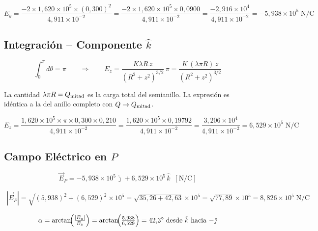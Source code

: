 \documentclass[12pt,letterpaper]{article}
\begin{document}
\begin{equation*}
    E_y = \frac{-2\times1{,}620\times10^5\times(0{,}300)^2}{4{,}911\times10^{-2}}
    = \frac{-2\times1{,}620\times10^5\times0{,}0900}{4{,}911\times10^{-2}}
    = \frac{-2{,}916\times10^4}{4{,}911\times10^{-2}}
    = -5{,}938\times10^5\;\text{N/C}
\end{equation*}

\subsection*{Integraci\'on -- Componente $\hat{k}$}

\begin{equation*}
    \int_0^{\pi}d\theta = \pi
    \qquad\Rightarrow\qquad
    E_z = \frac{K\lambda R\,z}{(R^2+z^2)^{3/2}}\,\pi
    = \frac{K\,(\lambda\pi R)\,z}{(R^2+z^2)^{3/2}}
\end{equation*}

La cantidad $\lambda\pi R = Q_{\rm mitad}$ es la carga total del semianillo. La expresi\'on es
id\'entica a la del anillo completo con $Q\to Q_{\rm mitad}$.

\begin{equation*}
    E_z = \frac{1{,}620\times10^5\times\pi\times0{,}300\times0{,}210}{4{,}911\times10^{-2}}
    = \frac{1{,}620\times10^5\times0{,}19792}{4{,}911\times10^{-2}}
    = \frac{3{,}206\times10^4}{4{,}911\times10^{-2}}
    = 6{,}529\times10^5\;\text{N/C}
\end{equation*}

\subsection*{Campo El\'ectrico en $P$}

\begin{equation*}
    \boxed{\vec{E}_P = -5{,}938\times10^5\,\hat{\jmath}+6{,}529\times10^5\,\hat{k}\;\;[\text{N/C}]}
\end{equation*}

\begin{align*}
    |\vec{E}_P| = \sqrt{(5{,}938)^2+(6{,}529)^2}\times10^5
    = \sqrt{35{,}26+42{,}63}\times10^5
    = \sqrt{77{,}89}\times10^5
    = 8{,}826\times10^5\;\text{N/C}
    \quad
\end{align*}

\begin{align*}
\alpha = \arctan\!\Bigl(\tfrac{|E_y|}{E_z}\Bigr) 
= \arctan\!\Bigl(\tfrac{5{,}938}{6{,}529}\Bigr) 
= 42{,}3^\circ\;\text{desde }\hat{k}\text{ hacia }{-\hat{\jmath}}
\end{align*}
\end{document}
